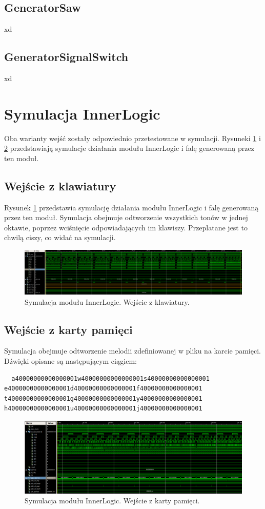 \documentclass[12pt]{article}
\begin{document}
\subsection{GeneratorSaw}
xd
\subsection{GeneratorSignalSwitch}
xd

\section{Symulacja InnerLogic}
Oba warianty wejść zostały odpowiednio przetestowane w symulacji. Rysuneki \ref{sim:kb} i \ref{sim:sd} przedstawiają symulacje działania modułu InnerLogic i falę generowaną przez ten moduł.
\subsection{Wejście z klawiatury}
Rysunek \ref{sim:kb} przedstawia symulację działania modułu InnerLogic i falę generowaną przez ten moduł. Symulacja obejmuje odtworzenie wszystkich tonów w jednej oktawie, poprzez wciśnięcie odpowiadających im klawiszy. Przeplatane jest to chwilą ciszy, co widać na symulacji.
\begin{figure}[h]
  \centering
  \includegraphics[decodearray={1 0 1 0 1 0}, width=\linewidth]{images/inner_sim_kb}
  \caption{Symulacja modułu InnerLogic. Wejście z klawiatury.}
  \label{sim:kb}
\end{figure}

\subsection{Wejście z karty pamięci}
 Symulacja obejmuje odtworzenie melodii zdefiniowanej w pliku na karcie pamięci. Dźwięki opisane są następującym ciągiem:
 \begin{lstlisting}
  a40000000000000001w40000000000000001s40000000000000001 e40000000000000001d40000000000000001f40000000000000001 t40000000000000001g40000000000000001y40000000000000001 h40000000000000001u40000000000000001j40000000000000001
 \end{lstlisting}
\begin{figure}[h]
  \centering
  \includegraphics[decodearray={1 0 1 0 1 0}, width=\linewidth]{images/inner_sim_sd}
  \caption{Symulacja modułu InnerLogic. Wejście z karty pamięci.}
  \label{sim:sd}
\end{figure}
\end{document}
